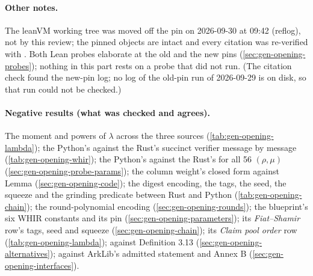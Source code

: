\paragraph{Other notes.} The leanVM working tree was moved off the pin on 2026-09-30 at 09:42
(reflog), not by this review; the pinned objects are intact and every citation was re-verified with
. Both Lean probes elaborate at the old and the new pins
(\cref{sec:gen-opening-probes}); nothing in this part rests on a probe that did not run. (The citation
check found the new-pin log; no log of the old-pin run of 2026-09-29 is on disk, so that run could
not be checked.)

\paragraph{Negative results (what was checked and agrees).} The moment and powers of $λ$ across the
three sources (\cref{tab:gen-opening-lambda}); the Python's  against the Rust's
succinct verifier message by message (\cref{tab:gen-opening-whir}); the Python's
 against the Rust's  for all 56 $(ρ, μ)$
(\cref{sec:gen-opening-probe-params}); the column weight's closed form against Lemma
 (\cref{sec:gen-opening-code}); the digest encoding, the tags, the seed, the
squeeze and the grinding predicate between Rust and Python (\cref{tab:gen-opening-chain}); the
round-polynomial encoding (\cref{sec:gen-opening-rounds}); the blueprint's six WHIR constants and
its  pin (\cref{sec:gen-opening-parameters}); its \emph{Fiat--Shamir} row's
tags, seed and squeeze (\cref{sec:gen-opening-chain}); its \emph{Claim pool order} row
(\cref{tab:gen-opening-lambda});  against Definition 3.13
(\cref{sec:gen-opening-alternatives});  against ArkLib's admitted statement and
Annex B (\cref{sec:gen-opening-interfaces}).
